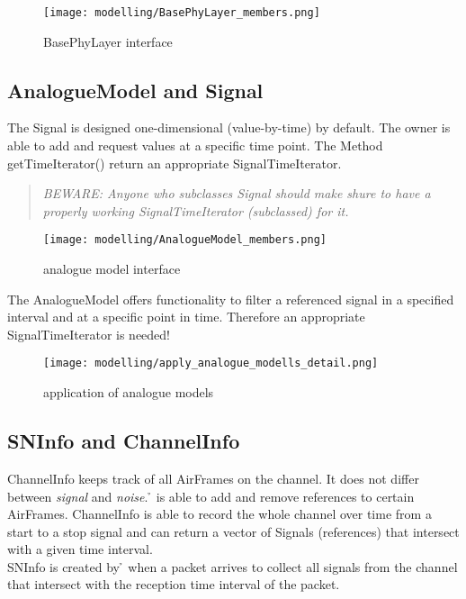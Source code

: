 \begin{figure}[H]
 \centering
 \texttt{[image: modelling/BasePhyLayer\_members.png]}
 \caption{BasePhyLayer interface}
 \label{fig: BasePhyLayer interface}
\end{figure}
\newpage


\subsection{AnalogueModel and Signal}


The Signal is designed one-dimensional (value-by-time) by default. The owner is able
to add and request values at a specific time point.
The Method getTimeIterator() return an appropriate SignalTimeIterator.
\begin{quote}
\emph{BEWARE: Anyone who subclasses Signal should make shure to have a properly
working SignalTimeIterator (subclassed) for it.}
\end{quote}

\begin{figure}[H]
 \centering
 \texttt{[image: modelling/AnalogueModel\_members.png]}
 \caption{analogue model interface}
 \label{fig: analogue model interface}
\end{figure}

The AnalogueModel offers functionality to filter a referenced signal in a specified
interval and at a specific point in time. Therefore an appropriate SignalTimeIterator is needed!

\begin{figure}[H]
 \centering
 \texttt{[image: modelling/apply\_analogue\_modells\_detail.png]}
 \caption{application of analogue models}
 \label{fig: application analogue models}
\end{figure}
\newpage



\subsection{SNInfo and ChannelInfo}

ChannelInfo keeps track of all AirFrames on the channel. It does not differ between \textit{signal} and \textit{noise}. \h{\bp} is able to
add and remove references to certain AirFrames.
ChannelInfo is able to record the whole channel over time from a start to a stop signal and can return a vector of Signals (references) that intersect with a given time interval.\\
SNInfo is created by \h{\bp} when a packet arrives to collect all signals from the channel that intersect with the reception time interval of the packet.


